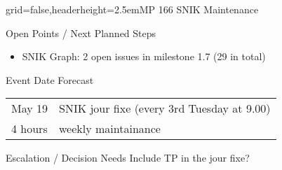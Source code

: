 \documentclass[english]{kiesgrube}
\begin{document}
\begin{poster}{grid=false,headerheight=2.5em}{}{MP 166 SNIK Maintenance}{}{}
\begin{posterbox}[name=open,column=1,below=description]{Open Points / Next Planned Steps}
\begin{itemize}
\item SNIK Graph: 2 open issues in milestone 1.7 (29 in total)
\end{itemize}
\end{posterbox}
\begin{posterbox}[name=event,column=1,below=open]{Event Date Forecast}
\begin{tabulary}{\textwidth}{lL}
May 19		&SNIK jour fixe	(every 3rd Tuesday at 9.00)\\
4 hours		&weekly maintainance\\
\end{tabulary}
\end{posterbox}
\begin{posterbox}[name=escalation,column=1,below=event]{Escalation / Decision Needs}
Include TP in the jour fixe?
\end{posterbox}
\footer
\end{poster}

\newpage
\end{document}
